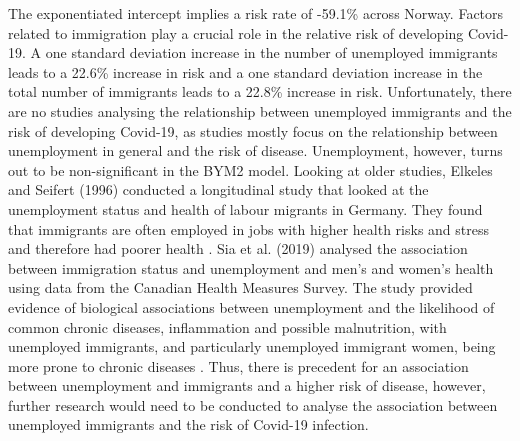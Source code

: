 The exponentiated intercept implies a risk rate of -59.1\% across Norway. Factors related to immigration play a crucial role in the relative risk of developing Covid-19. A one standard deviation increase in the number of unemployed immigrants leads to a 22.6\% increase in risk and a one standard deviation increase in the total number of immigrants leads to a 22.8\% increase in risk. Unfortunately, there are no studies analysing the relationship between unemployed immigrants and the risk of developing Covid-19, as studies mostly focus on the relationship between unemployment in general and the risk of disease. Unemployment, however, turns out to be non-significant in the BYM2 model. Looking at older studies, Elkeles and Seifert (1996) conducted a longitudinal study that looked at the unemployment status and health of labour migrants in Germany. They found that immigrants are often employed in jobs with higher health risks and stress and therefore had poorer health \autocite[][]{elkeles1996immigrants}. Sia et al. (2019) analysed the association between immigration status and unemployment and men's and women's health using data from the Canadian Health Measures Survey. The study provided evidence of biological associations between unemployment and the likelihood of common chronic diseases, inflammation and possible malnutrition, with unemployed immigrants, and particularly unemployed immigrant women, being more prone to chronic diseases \autocite[][]{sia2019chronic}. Thus, there is precedent for an association between unemployment and immigrants and a higher risk of disease, however, further research would need to be conducted to analyse the association between unemployed immigrants and the risk of Covid-19 infection. \\
